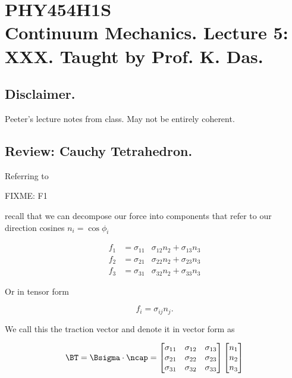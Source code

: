 
%

\chapter{PHY454H1S\\Continuum Mechanics.  Lecture 5: XXX.  Taught by Prof. K. Das.}
\label{chap:continuumL5}
{}
\date{Jan 25, 2012}

\beginArtWithToc

\section{Disclaimer.}

Peeter's lecture notes from class.  May not be entirely coherent.

\section{Review: Cauchy Tetrahedron.}

Referring to 

FIXME: F1

recall that we can decompose our force into components that refer to our direction cosines $n_i = \cos\phi_i$

\begin{align}\label{eqn:continuumL5:10}
f_1 &= \sigma_{11} & \sigma_{12} n_2 +\sigma_{13} n_3 \\
f_2 &= \sigma_{21} & \sigma_{22} n_2 +\sigma_{23} n_3 \\
f_3 &= \sigma_{31} & \sigma_{32} n_2 +\sigma_{33} n_3 
\end{align}

Or in tensor form

\begin{equation}\label{eqn:continuumL5:30}
f_i = \sigma_{ij} n_j.
\end{equation}

We call this the traction vector and denote it in vector form as

\begin{equation}\label{eqn:continuumL5:50}
\BT = \Bsigma \cdot \ncap
=
\begin{bmatrix}
\sigma_{11} & \sigma_{12} & \sigma_{13} \\
\sigma_{21} & \sigma_{22} & \sigma_{23} \\
\sigma_{31} & \sigma_{32} & \sigma_{33} 
\end{bmatrix}
\begin{bmatrix}
n_1 \\
n_2 \\
n_3 
\end{bmatrix}
\end{equation}

